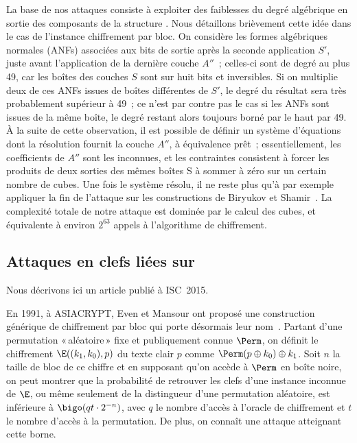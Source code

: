 La base de nos attaques consiste à exploiter des faiblesses du degré algébrique en sortie des composants de la structure \asasa. Nous détaillons brièvement cette idée dans le cas de l'instance
chiffrement par bloc. On considère les formes algébriques normales (ANFs) associées aux bits de sortie après la seconde application $S'$,
juste avant l'application de la dernière couche $A''$~;
celles-ci sont de degré au plus 49, car les boîtes des couches $S$ sont sur huit bits et inversibles. Si on multiplie deux de ces ANFs issues de boîtes différentes de $S'$, le degré du résultat
sera très probablement supérieur à 49~; ce n'est par contre pas le cas si les ANFs sont issues de la même boîte, le degré restant alors toujours borné par le haut par 49.
À la suite de cette observation, il est possible de définir un système d'équations dont la résolution fournit la couche $A''$, à équivalence prêt~;
essentiellement,
les coefficients de $A''$ sont les inconnues, et les contraintes consistent à forcer les produits de deux sorties des mêmes boîtes S à sommer à zéro sur un certain nombre de cubes. Une fois le système résolu, il ne reste plus qu'à par exemple
appliquer la fin de l'attaque sur les constructions \sasas de Biryukov et Shamir~\cite{DBLP:conf/eurocrypt/BiryukovS01}. La complexité totale de notre attaque est dominée par le calcul
des cubes, et équivalente à environ $2^{63}$ appels à l'algorithme de chiffrement.

\subsection{Attaques en clefs liées sur \proestotr \cite{DBLP:conf/isw/Karpman15}}

Nous décrivons ici un article publié à ISC~2015.

\medskip

En 1991, à ASIACRYPT, Even et Mansour ont proposé une construction générique de chiffrement par bloc qui porte désormais leur nom~\cite{EM}. Partant d'une permutation «\,aléatoire\,» fixe
et publiquement connue $\Perm$, on définit le chiffrement $\E((k_1,k_0),p)$ du texte clair $p$ comme $\Perm(p \oplus k_0) \oplus k_1$. Soit $n$ la taille de bloc de ce chiffre
et en supposant qu'on accède à $\Perm$ en boîte noire, on peut montrer que la probabilité de retrouver les clefs d'une instance inconnue de $\E$,
ou même seulement de la distingueur d'une permutation aléatoire, est inférieure à
$\bigo(qt \cdot 2^{-n})$, avec $q$ le nombre d'accès à l'oracle de chiffrement et $t$ le nombre d'accès à la permutation. De plus, on connaît une attaque atteignant cette borne.

